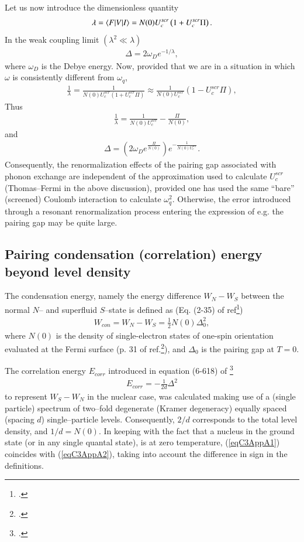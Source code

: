 \begin{subappendices}
Let us now introduce the dimensionless quantity
\begin{align}\label{eqC2AppA25}
\lambda=\langle {F|V|I} \rangle=N(0)U^{scr}_c\left(1+U^{scr}_c\Pi\right).
\end{align}
In the weak coupling limit $(\lambda^2\ll\lambda)$
\begin{align}\label{eqC2AppA26}
\Delta=2\omega_De^{-1/\lambda},
\end{align}
where $\omega_D$ is the Debye energy.
Now, provided that we are in a situation in which $\omega$ is consistently different from $\omega_q$,
\begin{align}\label{eqC2AppA28}
\frac{1}{\lambda}=\frac{1}{N(0)U^{scr}_c\left(1+U^{scr}_c\Pi\right)}\approx\frac{1}{N(0)U^{scr}_c}\left(1-U^{scr}_c\Pi\right),
\end{align}
Thus
\begin{align}\label{eqC2AppA29}
\frac{1}{\lambda}=\frac{1}{N(0)U^{scr}_c}-\frac{\Pi}{N(0)},
\end{align}
and
\begin{align}\label{eqC2AppA30}
\Delta=\left(2\omega_De^{\frac{\Pi}{N(0)}}\right)e^{-\frac{1}{N(0)U^{scr}_c}}.
\end{align}
Consequently, the renormalization effects of the pairing gap associated with phonon exchange are independent of the approximation used to calculate $U^{scr}_c$ (Thomas--Fermi in the above discussion), provided one has used the same ``bare'' (screened) Coulomb interaction to calculate $\omega^2_q$.   Otherwise, the error introduced through a resonant renormalization process entering the expression of e.g. the pairing gap may be quite large.
\subsection{Pairing condensation (correlation) energy beyond level density}



The condensation energy, namely the energy difference $W_N-W_S$ between the normal $N$-- and superfluid $S$--state is defined as (Eq. (2-35) of ref\footnote{\label{foot1}\cite{Schrieffer:64}.})
\begin{align}\label{eqC3AppA1}
W_{con}=W_N-W_S=\frac{1}{2}N(0)\Delta_0^2,
\end{align}
where $N(0)$ is the density of single-electron states of one-spin orientation evaluated at the Fermi surface (p. 31 of ref.\footnote{\cite{Schrieffer:64}.}), and $\Delta_0$ is the pairing gap at $T=0$.


The correlation energy $E_{corr}$ introduced in equation (6-618) of \footnote{\cite{Bohr:75}.}
\begin{align}\label{eqC3AppA2}
E_{corr}=-\frac{1}{2d}\Delta^2
\end{align}
to represent $W_S-W_N$ in the nuclear case, was calculated making use of a (single particle) spectrum of two--fold degenerate (Kramer degeneracy) equally spaced (spacing $d$) single--particle levels. Consequently, $2/d$ corresponds to the total level density, and $1/d=N(0)$. In keeping with the fact that a nucleus in the ground state (or in any single quantal state), is at zero temperature, (\ref{eqC3AppA1})  coincides with (\ref{eqC3AppA2}), taking into account the difference in sign in the definitions.

\end{subappendices}
